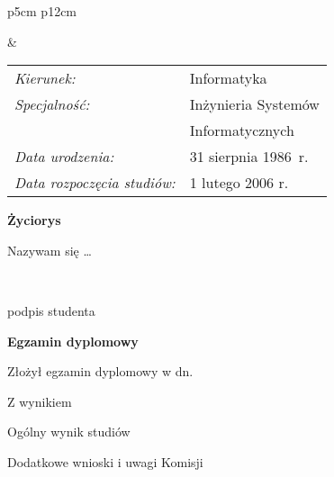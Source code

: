 \begin{titlepage}
    \newpage\thispagestyle{empty}
    \begin{tabular}{p{5cm} p{12cm}}
    \begin{minipage}{5cm}
    \center
    \end{minipage}
    &
    \begin{minipage}{12cm}
    \begin{flushleft}
    \par\noindent\vspace{1\baselineskip}
    \begin{tabular}[h]{l l}
    {\it Kierunek:}       & Informatyka \\[12pt]
    {\it Specjalność:}    & Inżynieria Systemów \\
                          & Informatycznych \\[12pt]
    {\it Data urodzenia:} & 31 sierpnia 1986~r. \\[12pt]
    {\it Data rozpoczęcia studiów:} & 1 lutego 2006 r. \\
    \end{tabular}
    \par\noindent\vspace{1\baselineskip}
    \end{flushleft}
    \end{minipage}
    \end{tabular}
    \vspace*{1\baselineskip}
    \begin{center}
        {\large\bfseries Życiorys}\par\bigskip
    \end{center}

    \indent
    Nazywam się \theauthor \dots {}
    \par
    \vspace{2\baselineskip}
    \hfill\parbox{15em}{{\small\dotfill}\\[-.3ex]
    \centerline{\footnotesize podpis studenta}}\par
    \vspace{3\baselineskip}
    \begin{center}
        {\large\bfseries Egzamin dyplomowy} \par\bigskip\bigskip
    \end{center}
    \par\noindent\vspace{1.5\baselineskip}
    Złożył egzamin dyplomowy w dn. \dotfill
    \par\noindent\vspace{1.5\baselineskip}
    Z wynikiem \dotfill
    \par\noindent\vspace{1.5\baselineskip}
    Ogólny wynik studiów \dotfill
    \par\noindent\vspace{1.5\baselineskip}
    Dodatkowe wnioski i uwagi Komisji \dotfill
    \par\noindent\vspace{1.5\baselineskip}
    \dotfill


\end{titlepage}
